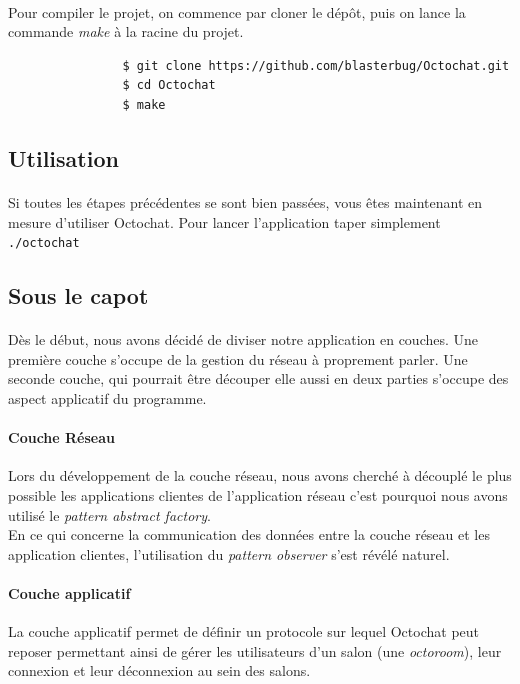 \documentclass[a4paper]{article}
\begin{document}
			\paragraph{}{
				Pour compiler le projet, on commence par cloner le dépôt, puis on lance la commande \textit{make} à la racine du projet.
			}

			\begin{verbatim}
				$ git clone https://github.com/blasterbug/Octochat.git
				$ cd Octochat
				$ make
			\end{verbatim}

		\subsection{Utilisation}
			\paragraph{}{
			Si toutes les étapes précédentes se sont bien passées, vous êtes maintenant en mesure d'utiliser Octochat.
			Pour lancer l'application taper simplement \verb|./octochat|
			}

		\subsection{Sous le capot}
			\paragraph{}{
			Dès le début, nous avons décidé de diviser notre application en couches.
			Une première couche s'occupe de la gestion du réseau à proprement parler. Une seconde couche,
			qui pourrait être découper elle aussi en deux parties s'occupe des aspect applicatif du programme.
			}

			\paragraph{Couche Réseau}{
			Lors du développement de la couche réseau, nous avons cherché à découplé le plus possible les
			applications clientes de l’application réseau c’est pourquoi nous avons utilisé le \textit{pattern
			abstract factory}. \\
			En ce qui concerne la communication des données entre la couche réseau et les application clientes,
			l’utilisation du \textit{pattern observer} s’est révélé naturel.
			}

			\paragraph{Couche applicatif}{
			La couche applicatif permet de définir un protocole sur lequel Octochat peut reposer permettant ainsi
			de gérer les utilisateurs d'un salon (une \textit{octoroom}), leur connexion et leur déconnexion au sein
			des salons.
			}
			
\end{document}
